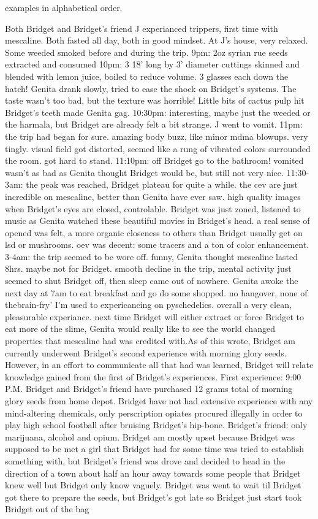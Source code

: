 \documentclass[12pt]{book}
\begin{document}
examples in alphabetical order.



Both Bridget and Bridget's friend J experianced trippers, first time with mescaline. Both fasted all day, both in good mindset. At J's house, very relaxed. Some weeded smoked before and during the trip. 9pm: 2oz syrian rue seeds extracted and consumed 10pm: 3 18' long by 3' diameter cuttings skinned and blended with lemon juice, boiled to reduce volume. 3 glasses each down the hatch! Genita drank slowly, tried to ease the shock on Bridget's systems. The taste wasn't too bad, but the texture was horrible! Little bits of cactus pulp hit Bridget's teeth made Genita gag. 10:30pm: interesting, maybe just the weeded or the harmala, but Bridget are already felt a bit strange. J went to vomit. 11pm: the trip had began for sure. amazing body buzz, like minor mdma blowups. very tingly. visual field got distorted, seemed like a rung of vibrated colors surrounded the room. got hard to stand. 11:10pm: off Bridget go to the bathroom! vomited wasn't as bad as Genita thought Bridget would be, but still not very nice. 11:30-3am: the peak was reached, Bridget plateau for quite a while. the cev are just incredible on mescaline, better than Genita have ever saw. high quality images when Bridget's eyes are closed, controlable. Bridget was just zoned, listened to music as Genita watched these beautiful movies in Bridget's head. a real sense of opened was felt, a more organic closeness to others than Bridget usually get on lsd or mushrooms. oev was decent: some tracers and a ton of color enhancement. 3-4am: the trip seemed to be wore off. funny, Genita thought mescaline lasted 8hrs. maybe not for Bridget. smooth decline in the trip, mental activity just seemed to shut Bridget off, then sleep came out of nowhere. Genita awoke the next day at 7am to eat breakfast and go do some shopped. no hangover, none of thebrain-fry' I'm used to expericancing on pyschedelics. overall a very clean, pleasurable experiance. next time Bridget will either extract or force Bridget to eat more of the slime, Genita would really like to see the world changed properties that mescaline had was credited with.As of this wrote, Bridget am currently underwent Bridget's second experience with morning glory seeds. However, in an effort to communicate all that had was learned, Bridget will relate knowledge gained from the first of Bridget's experiences. First experience: 9:00 P.M. Bridget and Bridget's friend have purchased 12 grams total of morning glory seeds from home depot. Bridget have not had extensive experience with any mind-altering chemicals, only perscription opiates procured illegally in order to play high school football after bruising Bridget's hip-bone. Bridget's friend: only marijuana, alcohol and opium. Bridget am mostly upset because Bridget was supposed to be met a girl that Bridget had for some time was tried to establish something with, but Bridget's friend was drove and decided to head in the direction of a town about half an hour away towards some people that Bridget knew well but Bridget only know vaguely. Bridget was went to wait til Bridget got there to prepare the seeds, but Bridget's got late so Bridget just start took Bridget out of the bag 
\end{document}

